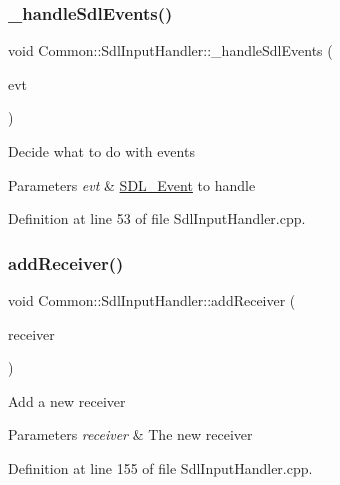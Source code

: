 \subsubsection{\texorpdfstring{\+\_\+handle\+Sdl\+Events()}{\_handleSdlEvents()}}
{\footnotesize\ttfamily void Common\+::\+Sdl\+Input\+Handler\+::\+\_\+handle\+Sdl\+Events (\begin{DoxyParamCaption}\item[{const \hyperlink{union_s_d_l___event}{S\+D\+L\+\_\+\+Event} \&}]{evt }\end{DoxyParamCaption})}

Decide what to do with events 
\begin{DoxyParams}{Parameters}
{\em evt} & \hyperlink{union_s_d_l___event}{S\+D\+L\+\_\+\+Event} to handle \\
\hline
\end{DoxyParams}


Definition at line 53 of file Sdl\+Input\+Handler.\+cpp.

\mbox{\label{class_common_1_1_sdl_input_handler_aa1a7c47e721048e1103db4038571f5c3}} 
\subsubsection{\texorpdfstring{add\+Receiver()}{addReceiver()}}
{\footnotesize\ttfamily void Common\+::\+Sdl\+Input\+Handler\+::add\+Receiver (\begin{DoxyParamCaption}\item[{\hyperlink{class_common_1_1_base_system}{Base\+System} $\ast$}]{receiver }\end{DoxyParamCaption})}

Add a new receiver 
\begin{DoxyParams}{Parameters}
{\em receiver} & The new receiver \\
\hline
\end{DoxyParams}


Definition at line 155 of file Sdl\+Input\+Handler.\+cpp.

\mbox{\label{class_common_1_1_sdl_input_handler_a6ff9bcb5862bc2c14a13bbd573d6fdf4}} 

